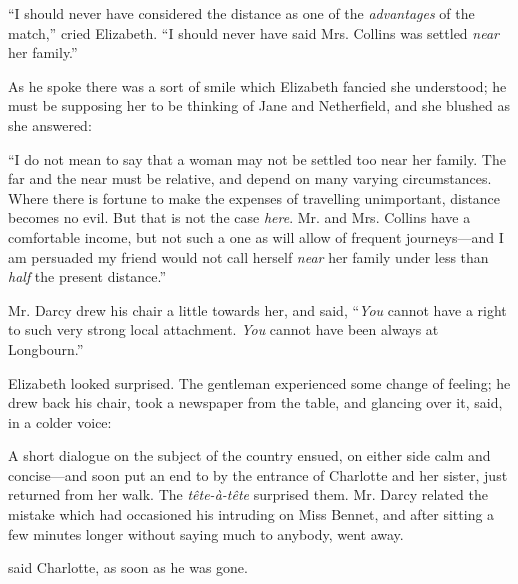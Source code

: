 


“I should never have considered the distance as one of the {\em advantages} of the match,” cried Elizabeth. “I should never have said Mrs. Collins was settled {\em near} her family.”


As he spoke there was a sort of smile which Elizabeth fancied she understood; he must be supposing her to be thinking of Jane and Netherfield, and she blushed as she answered:

“I do not mean to say that a woman may not be settled too near her family. The far and the near must be relative, and depend on many varying circumstances. Where there is fortune to make the expenses of travelling unimportant, distance becomes no evil. But that is not the case {\em here}. Mr. and Mrs. Collins have a comfortable income, but not such a one as will allow of frequent journeys---and I am persuaded my friend would not call herself {\em near} her family under less than {\em half} the present distance.”

Mr. Darcy drew his chair a little towards her, and said, “{\em You} cannot have a right to such very strong local attachment. {\em You} cannot have been always at Longbourn.”

Elizabeth looked surprised. The gentleman experienced some change of feeling; he drew back his chair, took a newspaper from the table, and glancing over it, said, in a colder voice:


A short dialogue on the subject of the country ensued, on either side calm and concise---and soon put an end to by the entrance of Charlotte and her sister, just returned from her walk. The {\em tête-à-tête} surprised them. Mr. Darcy related the mistake which had occasioned his intruding on Miss Bennet, and after sitting a few minutes longer without saying much to anybody, went away.

 said Charlotte, as soon as he was gone. 

